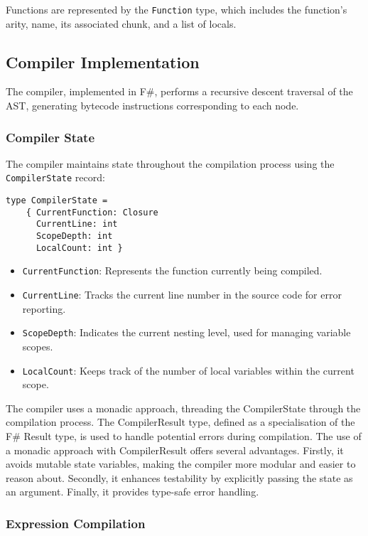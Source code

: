 Functions are represented by the \texttt{Function} type, which includes the function's arity, name, its associated chunk, and a list of locals.

\subsection{Compiler Implementation}\label{subsec:compiler-implementation}

The compiler, implemented in F\#, performs a recursive descent traversal of the AST, generating bytecode 
instructions corresponding to each node.

\subsubsection{Compiler State}

The compiler maintains state throughout the compilation process using the \texttt{CompilerState} record:

\begin{verbatim}
type CompilerState =
    { CurrentFunction: Closure
      CurrentLine: int
      ScopeDepth: int
      LocalCount: int }
\end{verbatim}

\begin{itemize}
\item \texttt{CurrentFunction}:  Represents the function currently being compiled.
\item \texttt{CurrentLine}: Tracks the current line number in the source code for error reporting.
\item \texttt{ScopeDepth}:  Indicates the current nesting level, used for managing variable scopes.
\item \texttt{LocalCount}: Keeps track of the number of local variables within the current scope.
\end{itemize}

The compiler uses a monadic approach, threading the CompilerState through the compilation process.
The CompilerResult type, defined as a specialisation of the F\# Result type, is used to handle potential errors during 
compilation.
The use of a monadic approach with CompilerResult offers several advantages.
Firstly, it avoids mutable state variables, making the compiler more modular and easier to reason about.
Secondly, it enhances testability by explicitly passing the state as an argument.
Finally, it provides type-safe error handling.

\subsubsection{Expression Compilation}

